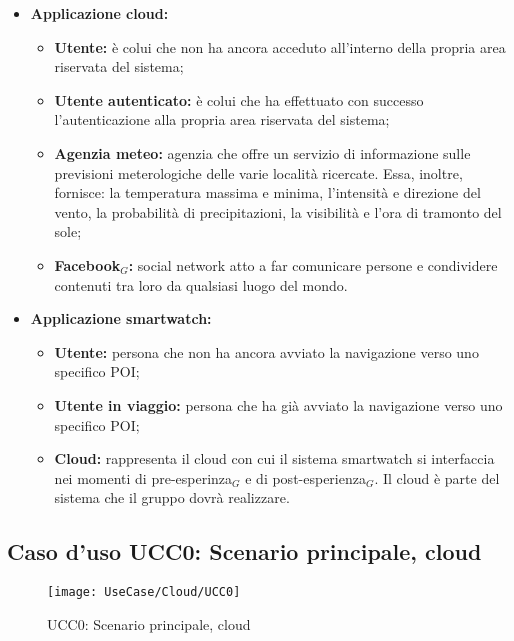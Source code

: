 \begin{itemize}
\item \textbf{Applicazione cloud:}
\begin{itemize}
\item \textbf{Utente:} è colui che non ha ancora acceduto all'interno della propria area riservata del sistema;
\item \textbf{Utente autenticato:} è colui che ha effettuato con successo l'autenticazione alla propria area riservata del sistema;
\item \textbf{Agenzia meteo:} agenzia che offre un servizio di informazione sulle previsioni meterologiche delle varie località ricercate. Essa, inoltre, fornisce: la temperatura massima e minima, l'intensità e direzione del vento, la probabilità di precipitazioni, la visibilità e l'ora di tramonto del sole;
\item \textbf{Facebook$_{G}$:} social network atto a far comunicare persone e condividere contenuti tra loro da qualsiasi luogo del mondo.
\end{itemize}
\item \textbf{Applicazione smartwatch:}
\begin{itemize}
\item \textbf{Utente:} persona che non ha ancora avviato la navigazione verso uno specifico POI;
\item \textbf{Utente in viaggio:} persona che ha già avviato la navigazione verso uno specifico POI;
\item \textbf{Cloud:} rappresenta il cloud con cui il sistema smartwatch si interfaccia nei momenti di pre-esperinza$_{G}$ e di post-esperienza$_{G}$. Il cloud è parte del sistema che il gruppo \GRUPPO{} dovrà realizzare.
\end{itemize}
\end{itemize}

\subsection{Caso d'uso UCC0: Scenario principale, cloud}

\begin{figure}[H]
\centering
\texttt{[image: UseCase/Cloud/UCC0]}
\caption{UCC0: Scenario principale, cloud}
\end{figure}


